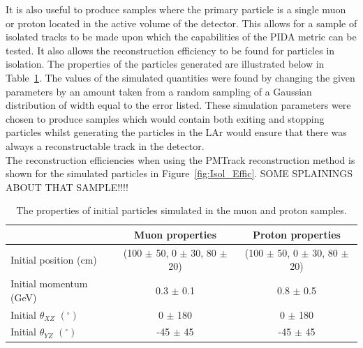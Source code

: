 It is also useful to produce samples where the primary particle is a single muon or proton located in the active volume of the detector. This allows for a sample of isolated tracks to be made upon which the capabilities of the PIDA metric can be tested. It also allows the reconstruction efficiency to be found for particles in isolation. The properties of the particles generated are illustrated below in Table~\ref{tab:IsolProp}. The values of the simulated quantities were found by changing the given parameters by an amount taken from a random sampling of a Gaussian distribution of width equal to the error listed. These simulation parameters were chosen to produce samples which would contain both exiting and stopping particles whilst generating the particles in the LAr would ensure that there was always a reconstructable track in the detector. \\

The reconstruction efficiencies when using the PMTrack reconstruction method is shown for the simulated particles in Figure~\ref{fig:Isol_Effic}. SOME SPLAININGS ABOUT THAT SAMPLE!!!! \\

\begin{table}
\caption{The properties of initial particles simulated in the muon and proton samples.}
\centering
\label{tab:IsolProp}
\begin{tabular}{l c c}
\toprule
{} & {Muon properties} & {Proton properties} \\ 
\midrule
Initial position (cm)              & (100 $\pm$ 50, 0 $\pm$ 30, 80 $\pm$ 20) & (100 $\pm$ 50, 0 $\pm$ 30, 80 $\pm$ 20)  \\

Initial momentum (GeV)            & 0.3 $\pm$ 0.1 & 0.8 $\pm$ 0.5 \\

Initial $\theta_{XZ}$ $(^{\circ})$ &   0 $\pm$ 180 &   0 $\pm$ 180 \\

Initial $\theta_{YZ}$ $(^{\circ})$ & -45 $\pm$ 45  & -45 $\pm$ 45  \\
\bottomrule
\end{tabular}
\end{table}

